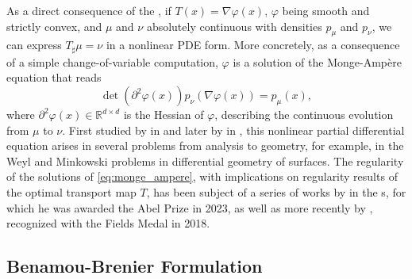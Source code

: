 As a direct consequence of the , if $T(x) = \nabla \varphi(x)$, $\varphi$ being smooth and strictly convex, and $\mu$ and $\nu$ absolutely continuous with densities $p_\mu$ and $p_\nu$, we can express $T_\sharp \mu = \nu$ in a nonlinear \acrfull{PDE} form. More concretely, as a consequence of a simple change-of-variable computation, $\varphi$ is a solution of the Monge-Amp{\`e}re equation that reads
\begin{equation} \label{eq:monge_ampere}
	\operatorname{det}\left(\partial^2 \varphi(x)\right) p_\nu(\nabla \varphi(x))=p_\mu(x),
\end{equation}
where $\partial^2 \varphi(x) \in \mathbb{R}^{d \times d}$ is the Hessian of $\varphi$, describing the continuous evolution from $\mu$ to $\nu$.
First studied by \citeauthor{monge1781histoire} in \citeyear{monge1781histoire} and later by \citeauthor{ampere1819memoire} in \citeyear{ampere1819memoire}, this nonlinear partial differential equation arises in several problems from analysis to geometry, for example, in the Weyl and Minkowski problems in differential geometry of surfaces. 
The regularity of the solutions of \eqref{eq:monge_ampere}, with implications on regularity results of the optimal transport map $T$, has been subject of a series of works by \citeauthor{caffarelli1990interior} in the \citeyear{caffarelli1990interior}s, for which he was awarded the Abel Prize in 2023, as well as more recently by \citeauthor{figalli2017monge}, recognized with the Fields Medal in 2018.


\subsection{Benamou-Brenier Formulation} \label{sec:background_benamou_brenier}

